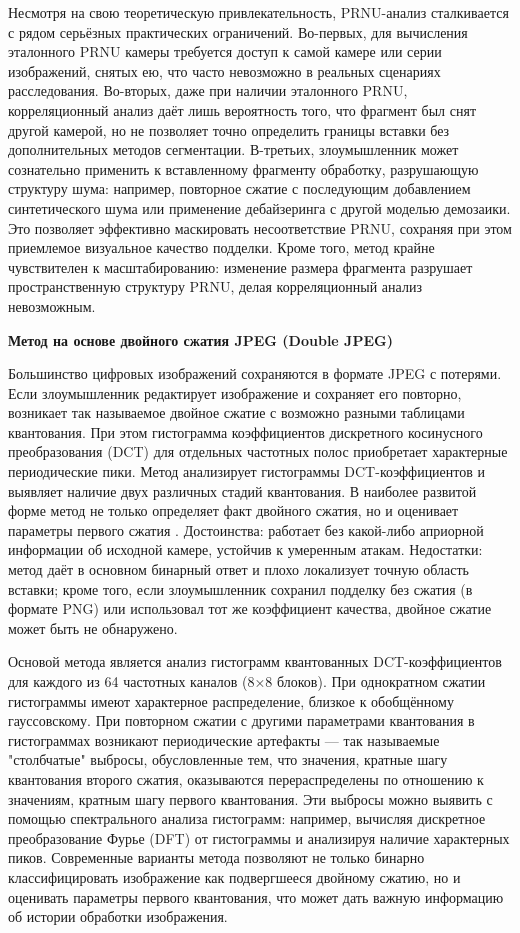 Несмотря на свою теоретическую привлекательность, PRNU-анализ сталкивается с рядом серьёзных практических ограничений. Во-первых, для вычисления эталонного PRNU камеры требуется доступ к самой камере или серии изображений, снятых ею, что часто невозможно в реальных сценариях расследования. Во-вторых, даже при наличии эталонного PRNU, корреляционный анализ даёт лишь вероятность того, что фрагмент был снят другой камерой, но не позволяет точно определить границы вставки без дополнительных методов сегментации. В-третьих, злоумышленник может сознательно применить к вставленному фрагменту обработку, разрушающую структуру шума: например, повторное сжатие с последующим добавлением синтетического шума или применение дебайзеринга с другой моделью демозаики. Это позволяет эффективно маскировать несоответствие PRNU, сохраняя при этом приемлемое визуальное качество подделки. Кроме того, метод крайне чувствителен к масштабированию: изменение размера фрагмента разрушает пространственную структуру PRNU, делая корреляционный анализ невозможным.

\textbf{Метод на основе двойного сжатия JPEG (Double JPEG)}

Большинство цифровых изображений сохраняются в формате JPEG с потерями. Если злоумышленник редактирует изображение и сохраняет его повторно, возникает так называемое двойное сжатие с возможно разными таблицами квантования. При этом гистограмма коэффициентов дискретного косинусного преобразования (DCT) для отдельных частотных полос приобретает характерные периодические пики. Метод анализирует гистограммы DCT-коэффициентов и выявляет наличие двух различных стадий квантования. В наиболее развитой форме метод не только определяет факт двойного сжатия, но и оценивает параметры первого сжатия \cite{11}. Достоинства: работает без какой-либо априорной информации об исходной камере, устойчив к умеренным атакам. Недостатки: метод даёт в основном бинарный ответ и плохо локализует точную область вставки; кроме того, если злоумышленник сохранил подделку без сжатия (в формате PNG) или использовал тот же коэффициент качества, двойное сжатие может быть не обнаружено.

Основой метода является анализ гистограмм квантованных DCT-коэффициентов для каждого из 64 частотных каналов (8×8 блоков). При однократном сжатии гистограммы имеют характерное распределение, близкое к обобщённому гауссовскому. При повторном сжатии с другими параметрами квантования в гистограммах возникают периодические артефакты — так называемые "столбчатые" выбросы, обусловленные тем, что значения, кратные шагу квантования второго сжатия, оказываются перераспределены по отношению к значениям, кратным шагу первого квантования. Эти выбросы можно выявить с помощью спектрального анализа гистограмм: например, вычисляя дискретное преобразование Фурье (DFT) от гистограммы и анализируя наличие характерных пиков. Современные варианты метода позволяют не только бинарно классифицировать изображение как подвергшееся двойному сжатию, но и оценивать параметры первого квантования, что может дать важную информацию об истории обработки изображения.

